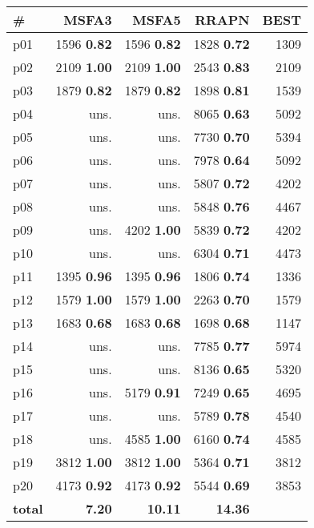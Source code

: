 \begin{tabular}{|l|rrr|r|}
\hline
\textbf{\#} & \textbf{MSFA3} & \textbf{MSFA5} & \textbf{RRAPN} & \textbf{BEST}\\
\hline
p01 & {\footnotesize 1596} \textbf{0.82} & {\footnotesize 1596} \textbf{0.82} & {\footnotesize 1828} \textbf{0.72} & 1309\\
p02 & {\footnotesize 2109} \textbf{1.00} & {\footnotesize 2109} \textbf{1.00} & {\footnotesize 2543} \textbf{0.83} & 2109\\
p03 & {\footnotesize 1879} \textbf{0.82} & {\footnotesize 1879} \textbf{0.82} & {\footnotesize 1898} \textbf{0.81} & 1539\\
p04 & uns. & uns. & {\footnotesize 8065} \textbf{0.63} & 5092\\
p05 & uns. & uns. & {\footnotesize 7730} \textbf{0.70} & 5394\\
p06 & uns. & uns. & {\footnotesize 7978} \textbf{0.64} & 5092\\
p07 & uns. & uns. & {\footnotesize 5807} \textbf{0.72} & 4202\\
p08 & uns. & uns. & {\footnotesize 5848} \textbf{0.76} & 4467\\
p09 & uns. & {\footnotesize 4202} \textbf{1.00} & {\footnotesize 5839} \textbf{0.72} & 4202\\
p10 & uns. & uns. & {\footnotesize 6304} \textbf{0.71} & 4473\\
p11 & {\footnotesize 1395} \textbf{0.96} & {\footnotesize 1395} \textbf{0.96} & {\footnotesize 1806} \textbf{0.74} & 1336\\
p12 & {\footnotesize 1579} \textbf{1.00} & {\footnotesize 1579} \textbf{1.00} & {\footnotesize 2263} \textbf{0.70} & 1579\\
p13 & {\footnotesize 1683} \textbf{0.68} & {\footnotesize 1683} \textbf{0.68} & {\footnotesize 1698} \textbf{0.68} & 1147\\
p14 & uns. & uns. & {\footnotesize 7785} \textbf{0.77} & 5974\\
p15 & uns. & uns. & {\footnotesize 8136} \textbf{0.65} & 5320\\
p16 & uns. & {\footnotesize 5179} \textbf{0.91} & {\footnotesize 7249} \textbf{0.65} & 4695\\
p17 & uns. & uns. & {\footnotesize 5789} \textbf{0.78} & 4540\\
p18 & uns. & {\footnotesize 4585} \textbf{1.00} & {\footnotesize 6160} \textbf{0.74} & 4585\\
p19 & {\footnotesize 3812} \textbf{1.00} & {\footnotesize 3812} \textbf{1.00} & {\footnotesize 5364} \textbf{0.71} & 3812\\
p20 & {\footnotesize 4173} \textbf{0.92} & {\footnotesize 4173} \textbf{0.92} & {\footnotesize 5544} \textbf{0.69} & 3853\\
\hline
\textbf{total} & \textbf{7.20} & \textbf{10.11} & \textbf{14.36} & \\
\hline
\end{tabular}

